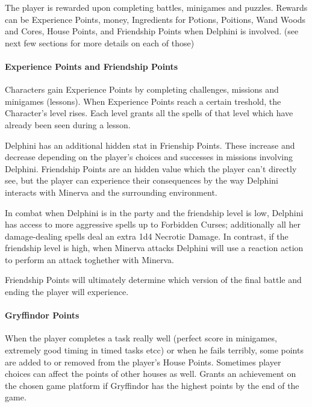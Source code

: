 The player is rewarded upon completing battles, minigames and puzzles. Rewards can be Experience Points, money, Ingredients for Potions, Poitions, Wand Woods and Cores, House Points, and Friendship Points when Delphini is involved. (see next few sections for more details on each of those)


\pagebreak
\paragraph{Experience Points and Friendship Points}

Characters gain Experience Points by completing challenges, missions and minigames (lessons). When Experience Points reach a certain treshold, the Character's level rises. 
Each level grants all the spells of that level which have already been seen during a lesson.

Delphini has an additional hidden stat in Frienship Points. These increase and decrease depending on the player's choices and successes in missions involving Delphini. Friendship Points are an hidden value which the player can't directly see, but the player can experience their consequences by the way Delphini interacts with Minerva and the surrounding environment.

In combat when Delphini is in the party and the friendship level is low, Delphini has access to more aggressive spells up to Forbidden Curses; additionally all her damage-dealing spells deal an extra 1d4 Necrotic Damage. In contrast, if the friendship level is high, when Minerva attacks Delphini will use a reaction action to perform an attack toghether with Minerva.

Friendship Points will ultimately determine which version of the final battle and ending the player will experience.

\paragraph{Gryffindor Points}

When the player completes a task really well (perfect score in minigames, extremely good timing in timed tasks etcc) or when he fails terribly, some points are added to or removed from the player's House Points. Sometimes player choices can affect the points of other houses as well.
Grants an achievement on the chosen game platform if Gryffindor has the highest points by the end of the game.

\pagebreak